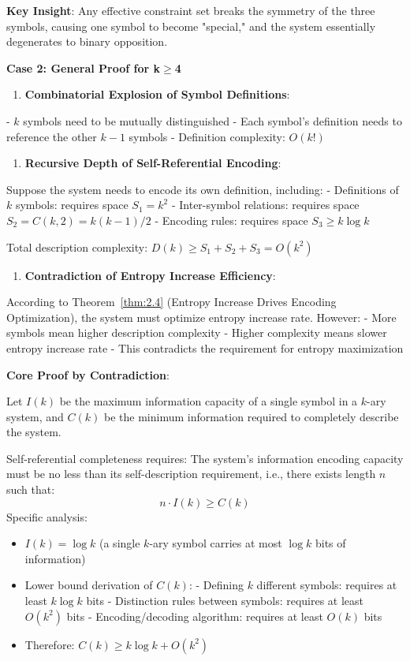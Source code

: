    \textbf{Key Insight}: Any effective constraint set breaks the symmetry of the three symbols, causing one symbol to become "special," and the system essentially degenerates to binary opposition.

\textbf{Case 2: General Proof for k$\geq$4}

\begin{enumerate}
\item \textbf{Combinatorial Explosion of Symbol Definitions}:
\end{enumerate}
   - $k$ symbols need to be mutually distinguished
   - Each symbol's definition needs to reference the other $k-1$ symbols
   - Definition complexity: $O(k!)$
   
\begin{enumerate}
\item \textbf{Recursive Depth of Self-Referential Encoding}:
\end{enumerate}
   Suppose the system needs to encode its own definition, including:
   - Definitions of $k$ symbols: requires space $S_1 = k^2$
   - Inter-symbol relations: requires space $S_2 = C(k,2) = k(k-1)/2$
   - Encoding rules: requires space $S_3 \geq k \log k$
   
   Total description complexity: $D(k) \geq S_1 + S_2 + S_3 = O(k^2)$

\begin{enumerate}
\item \textbf{Contradiction of Entropy Increase Efficiency}:
\end{enumerate}
   According to Theorem~\ref{thm:2.4} (Entropy Increase Drives Encoding Optimization), the system must optimize entropy increase rate. However:
   - More symbols mean higher description complexity
   - Higher complexity means slower entropy increase rate
   - This contradicts the requirement for entropy maximization

\textbf{Core Proof by Contradiction}:

Let $I(k)$ be the maximum information capacity of a single symbol in a $k$-ary system, and $C(k)$ be the minimum information required to completely describe the system.

Self-referential completeness requires: The system's information encoding capacity must be no less than its self-description requirement, i.e., there exists length $n$ such that:
\begin{equation}
n \cdot I(k) \geq C(k)
\end{equation}
Specific analysis:
\begin{itemize}
\item $I(k) = \log k$ (a single $k$-ary symbol carries at most $\log k$ bits of information)
\item Lower bound derivation of $C(k)$:
  - Defining $k$ different symbols: requires at least $k \log k$ bits
  - Distinction rules between symbols: requires at least $O(k^2)$ bits
  - Encoding/decoding algorithm: requires at least $O(k)$ bits
\item Therefore: $C(k) \geq k \log k + O(k^2)$
\end{itemize}

